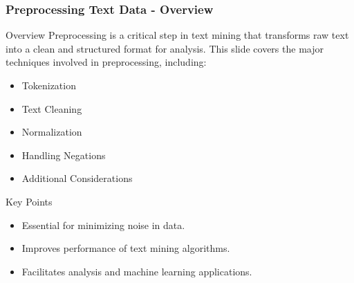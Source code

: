 \documentclass[aspectratio=169]{beamer}
\begin{document}
\begin{frame}
    \frametitle{Preprocessing Text Data - Overview}
    \begin{block}{Overview}
        Preprocessing is a critical step in text mining that transforms raw text into a clean and structured format for analysis. 
        This slide covers the major techniques involved in preprocessing, including:
    \end{block}
    \begin{itemize}
        \item Tokenization
        \item Text Cleaning
        \item Normalization
        \item Handling Negations
        \item Additional Considerations
    \end{itemize}
    \begin{block}{Key Points}
        \begin{itemize}
            \item Essential for minimizing noise in data.
            \item Improves performance of text mining algorithms.
            \item Facilitates analysis and machine learning applications.
        \end{itemize}
    \end{block}
\end{frame}
\end{document}

